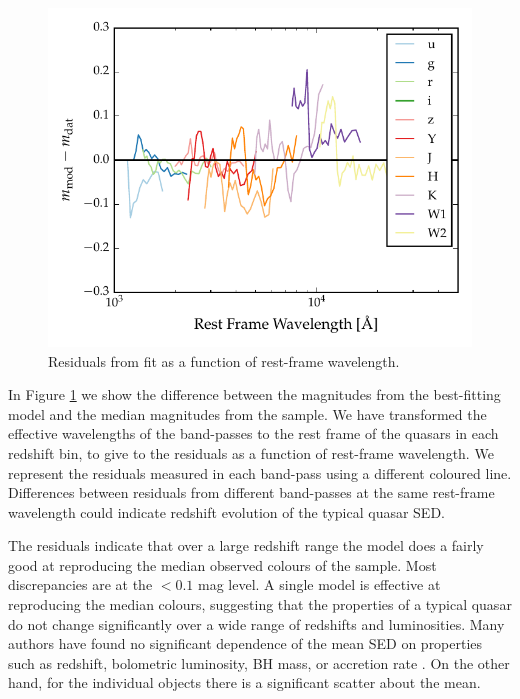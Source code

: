 \begin{figure}
  \centering
  \includegraphics[width=\textwidth]{figures/chapter05/model_residuals.pdf}
  \caption{Residuals from fit as a function of rest-frame wavelength.}
  \label{fig:residuals}
\end{figure}

In Figure \ref{fig:residuals} we show the difference between the magnitudes from the best-fitting model and the median magnitudes from the sample. 
We have transformed the effective wavelengths of the band-passes to the rest frame of the quasars in each redshift bin, to give to the residuals as a function of rest-frame wavelength. 
We represent the residuals measured in each band-pass using a different coloured line. 
Differences between residuals from different band-passes at the same rest-frame wavelength could indicate redshift evolution of the typical quasar SED. 

The residuals indicate that over a large redshift range the model does a fairly good at reproducing the median observed colours of the sample. 
Most discrepancies are at the $<0.1$ mag level. 
A single model is effective at reproducing the median colours, suggesting that the properties of a typical quasar do not change significantly over a wide range of redshifts and luminosities. 
Many authors have found no significant dependence of the mean \ac{SED} on properties such as redshift, bolometric luminosity, \ac{BH} mass, or accretion rate \citep[e.g.][]{elvis12,hao13}. 
On the other hand, for the individual objects there is a significant scatter about the mean.

